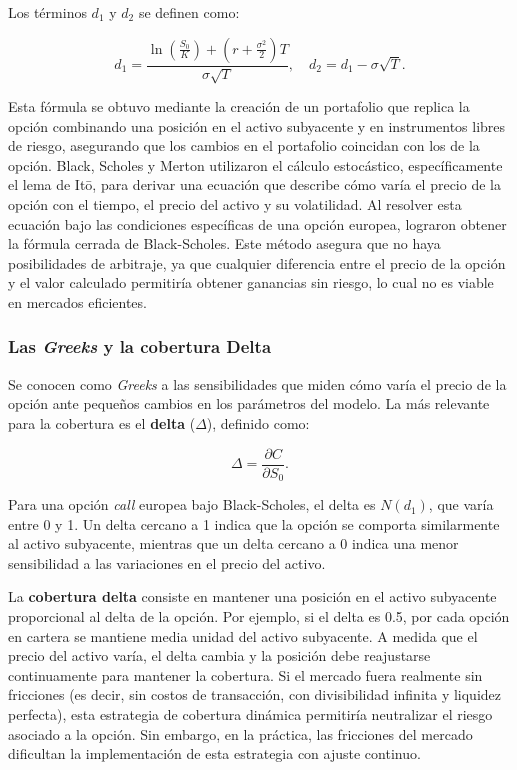 \documentclass[11pt,a4paper,spanish]{article}
\numberwithin{equation}{section} %
\begin{document}
Los términos $d_1$ y $d_2$ se definen como:

\begin{equation}
d_1 = \frac{\ln\left(\frac{S_0}{K}\right) + \left(r + \frac{\sigma^2}{2}\right)T}{\sigma \sqrt{T}}, \quad
d_2 = d_1 - \sigma \sqrt{T}.
\label{eq:d1-d2}
\end{equation}

Esta fórmula se obtuvo mediante la creación de un portafolio que replica la opción combinando una posición en el activo subyacente y en instrumentos libres de riesgo, asegurando que los cambios en el portafolio coincidan con los de la opción. Black, Scholes y Merton utilizaron el cálculo estocástico, específicamente el lema de It\={o}, para derivar una ecuación que describe cómo varía el precio de la opción con el tiempo, el precio del activo y su volatilidad. Al resolver esta ecuación bajo las condiciones específicas de una opción europea, lograron obtener la fórmula cerrada de Black-Scholes. Este método asegura que no haya posibilidades de arbitraje, ya que cualquier diferencia entre el precio de la opción y el valor calculado permitiría obtener ganancias sin riesgo, lo cual no es viable en mercados eficientes. 

\subsubsection{Las \textit{Greeks} y la cobertura Delta}

Se conocen como \textit{Greeks} a las sensibilidades que miden cómo varía el precio de la opción ante pequeños cambios en los parámetros del modelo. La más relevante para la cobertura es el \textbf{delta} ($\Delta$), definido como:

\begin{equation}
\Delta = \frac{\partial C}{\partial S_0}.
\end{equation}

Para una opción \textit{call} europea bajo Black-Scholes, el delta es $N(d_1)$, que varía entre 0 y 1. Un delta cercano a 1 indica que la opción se comporta similarmente al activo subyacente, mientras que un delta cercano a 0 indica una menor sensibilidad a las variaciones en el precio del activo.

La \textbf{cobertura delta} consiste en mantener una posición en el activo subyacente proporcional al delta de la opción. Por ejemplo, si el delta es 0.5, por cada opción en cartera se mantiene media unidad del activo subyacente. A medida que el precio del activo varía, el delta cambia y la posición debe reajustarse continuamente para mantener la cobertura. Si el mercado fuera realmente sin fricciones (es decir, sin costos de transacción, con divisibilidad infinita y liquidez perfecta), esta estrategia de cobertura dinámica permitiría neutralizar el riesgo asociado a la opción. Sin embargo, en la práctica, las fricciones del mercado dificultan la implementación de esta estrategia con ajuste continuo.
\end{document}
